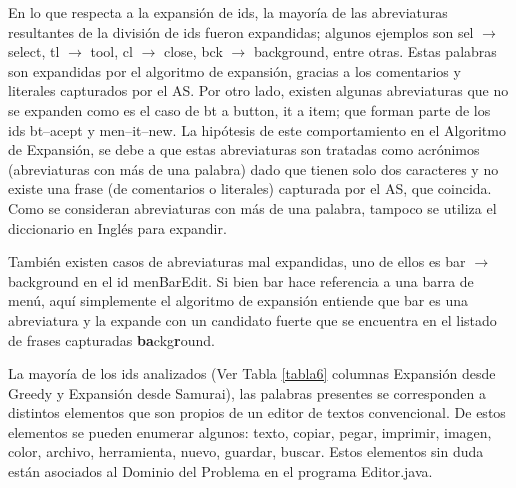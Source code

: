 En lo que respecta a la expansión de ids, la mayoría de las abreviaturas resultantes de la división de ids fueron expandidas; algunos ejemplos son \textsf{sel} $\rightarrow$ \textsf{select}, \textsf{tl} $\rightarrow$ \textsf{tool}, \textsf{cl} $\rightarrow$ \textsf{close}, \textsf{bck} $\rightarrow$ \textsf{background}, entre otras. Estas palabras son expandidas por el algoritmo de expansión, gracias a los comentarios y literales capturados por el AS.
Por otro lado, existen algunas abreviaturas que no se expanden como es el caso de \textsf{bt} a \textsf{button}, \textsf{it} a \textsf{item}; que forman parte de los ids \textsf{bt--acept} y \textsf{men--it--new}. La hipótesis de este comportamiento en el Algoritmo de Expansión, se debe a que estas abreviaturas son tratadas como acrónimos (abreviaturas con más de una palabra) dado que tienen solo dos caracteres y no existe una frase (de comentarios o literales) capturada por el AS, que coincida. Como se consideran abreviaturas con más de una palabra, tampoco se utiliza el diccionario en Inglés para expandir.

También existen casos de abreviaturas mal expandidas, uno de ellos es \textsf{bar} $\rightarrow$ \textsf{background} en el id \textsf{menBarEdit}. Si bien \textsf{bar} hace referencia a una barra de menú, aquí simplemente el algoritmo de expansión entiende que \textsf{bar} es una abreviatura y la expande con un candidato fuerte que se encuentra en el listado de frases capturadas \textsf{\textbf{ba}ckg\textbf{r}ound}.

La mayoría de los ids analizados (Ver Tabla \ref{tabla6} columnas Expansión desde Greedy y Expansión desde Samurai), las palabras presentes se corresponden a distintos elementos que son propios de un editor de textos convencional. De estos elementos se pueden enumerar algunos: texto, copiar, pegar, imprimir, imagen, color, archivo, herramienta, nuevo, guardar, buscar. Estos elementos sin duda están asociados al Dominio del Problema en el programa Editor.java.

